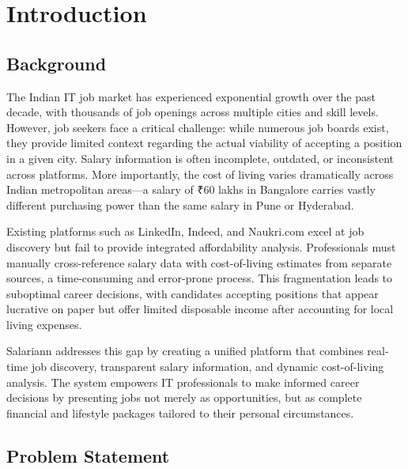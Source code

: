 
\newpage
\pagestyle{fancy}
\chapter{Introduction}

\section{Background}

The Indian IT job market has experienced exponential growth over the past decade, with thousands of job openings across multiple cities and skill levels. However, job seekers face a critical challenge: while numerous job boards exist, they provide limited context regarding the actual viability of accepting a position in a given city. Salary information is often incomplete, outdated, or inconsistent across platforms. More importantly, the cost of living varies dramatically across Indian metropolitan areas---a salary of ₹60 lakhs in Bangalore carries vastly different purchasing power than the same salary in Pune or Hyderabad.

Existing platforms such as LinkedIn, Indeed, and Naukri.com excel at job discovery but fail to provide integrated affordability analysis. Professionals must manually cross-reference salary data with cost-of-living estimates from separate sources, a time-consuming and error-prone process. This fragmentation leads to suboptimal career decisions, with candidates accepting positions that appear lucrative on paper but offer limited disposable income after accounting for local living expenses.

Salariann addresses this gap by creating a unified platform that combines real-time job discovery, transparent salary information, and dynamic cost-of-living analysis. The system empowers IT professionals to make informed career decisions by presenting jobs not merely as opportunities, but as complete financial and lifestyle packages tailored to their personal circumstances.

\section{Problem Statement}


